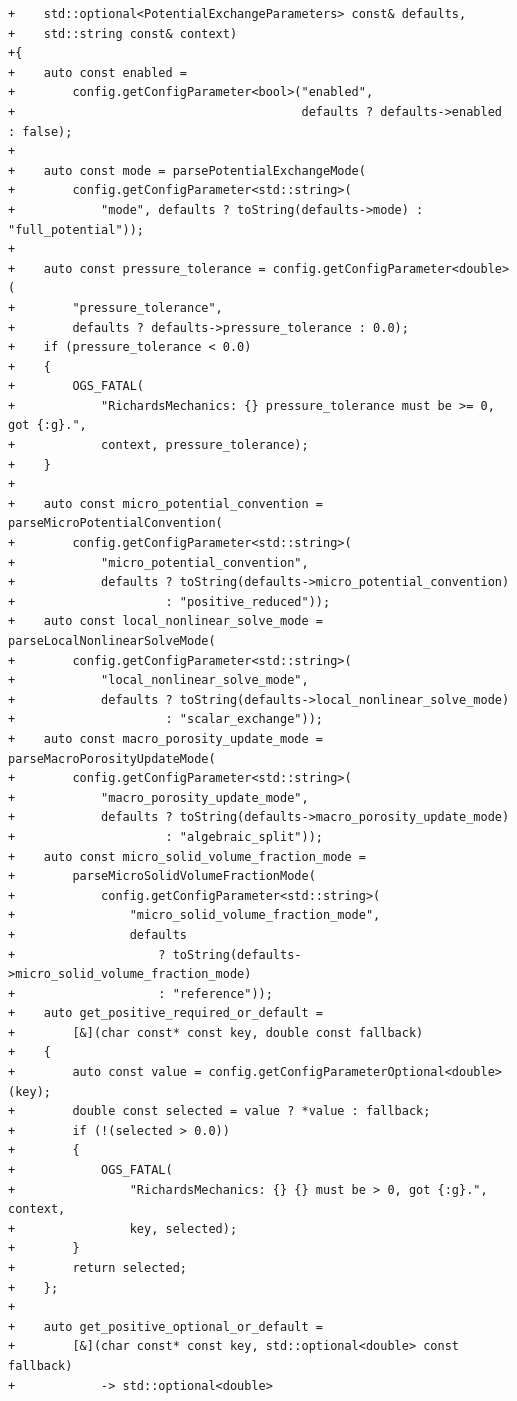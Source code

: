\documentclass[10pt]{article}
\begin{document}
\begin{lstlisting}
+    std::optional<PotentialExchangeParameters> const& defaults,
+    std::string const& context)
+{
+    auto const enabled =
+        config.getConfigParameter<bool>("enabled",
+                                        defaults ? defaults->enabled : false);
+
+    auto const mode = parsePotentialExchangeMode(
+        config.getConfigParameter<std::string>(
+            "mode", defaults ? toString(defaults->mode) : "full_potential"));
+
+    auto const pressure_tolerance = config.getConfigParameter<double>(
+        "pressure_tolerance",
+        defaults ? defaults->pressure_tolerance : 0.0);
+    if (pressure_tolerance < 0.0)
+    {
+        OGS_FATAL(
+            "RichardsMechanics: {} pressure_tolerance must be >= 0, got {:g}.",
+            context, pressure_tolerance);
+    }
+
+    auto const micro_potential_convention = parseMicroPotentialConvention(
+        config.getConfigParameter<std::string>(
+            "micro_potential_convention",
+            defaults ? toString(defaults->micro_potential_convention)
+                     : "positive_reduced"));
+    auto const local_nonlinear_solve_mode = parseLocalNonlinearSolveMode(
+        config.getConfigParameter<std::string>(
+            "local_nonlinear_solve_mode",
+            defaults ? toString(defaults->local_nonlinear_solve_mode)
+                     : "scalar_exchange"));
+    auto const macro_porosity_update_mode = parseMacroPorosityUpdateMode(
+        config.getConfigParameter<std::string>(
+            "macro_porosity_update_mode",
+            defaults ? toString(defaults->macro_porosity_update_mode)
+                     : "algebraic_split"));
+    auto const micro_solid_volume_fraction_mode =
+        parseMicroSolidVolumeFractionMode(
+            config.getConfigParameter<std::string>(
+                "micro_solid_volume_fraction_mode",
+                defaults
+                    ? toString(defaults->micro_solid_volume_fraction_mode)
+                    : "reference"));
+    auto get_positive_required_or_default =
+        [&](char const* const key, double const fallback)
+    {
+        auto const value = config.getConfigParameterOptional<double>(key);
+        double const selected = value ? *value : fallback;
+        if (!(selected > 0.0))
+        {
+            OGS_FATAL(
+                "RichardsMechanics: {} {} must be > 0, got {:g}.", context,
+                key, selected);
+        }
+        return selected;
+    };
+
+    auto get_positive_optional_or_default =
+        [&](char const* const key, std::optional<double> const fallback)
+            -> std::optional<double>

\end{lstlisting}
\end{document}

